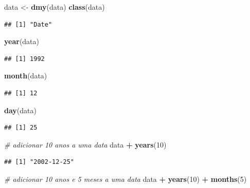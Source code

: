\documentclass[
]{book}
\newenvironment{Shaded}{\begin{snugshade}}{\end{snugshade}}
\newcommand{\CommentTok}[1]{\textcolor[rgb]{0.56,0.35,0.01}{\textit{#1}}}
\newcommand{\DecValTok}[1]{\textcolor[rgb]{0.00,0.00,0.81}{#1}}
\newcommand{\FunctionTok}[1]{\textcolor[rgb]{0.13,0.29,0.53}{\textbf{#1}}}
\newcommand{\NormalTok}[1]{#1}
\newcommand{\OtherTok}[1]{\textcolor[rgb]{0.56,0.35,0.01}{#1}}
\newcommand{\SpecialCharTok}[1]{\textcolor[rgb]{0.81,0.36,0.00}{\textbf{#1}}}
\begin{document}
\begin{Shaded}
\begin{Highlighting}[]
\NormalTok{data }\OtherTok{\textless{}{-}} \FunctionTok{dmy}\NormalTok{(data)}
\FunctionTok{class}\NormalTok{(data)}
\end{Highlighting}
\end{Shaded}

\begin{verbatim}
## [1] "Date"
\end{verbatim}

\begin{Shaded}
\begin{Highlighting}[]
\FunctionTok{year}\NormalTok{(data)}
\end{Highlighting}
\end{Shaded}

\begin{verbatim}
## [1] 1992
\end{verbatim}

\begin{Shaded}
\begin{Highlighting}[]
\FunctionTok{month}\NormalTok{(data)}
\end{Highlighting}
\end{Shaded}

\begin{verbatim}
## [1] 12
\end{verbatim}

\begin{Shaded}
\begin{Highlighting}[]
\FunctionTok{day}\NormalTok{(data)}
\end{Highlighting}
\end{Shaded}

\begin{verbatim}
## [1] 25
\end{verbatim}

\begin{Shaded}
\begin{Highlighting}[]
\CommentTok{\# adicionar 10 anos a uma data}
\NormalTok{data }\SpecialCharTok{+} \FunctionTok{years}\NormalTok{(}\DecValTok{10}\NormalTok{)}
\end{Highlighting}
\end{Shaded}

\begin{verbatim}
## [1] "2002-12-25"
\end{verbatim}

\begin{Shaded}
\begin{Highlighting}[]
\CommentTok{\# adicionar 10 anos e 5 meses a uma data}
\NormalTok{data }\SpecialCharTok{+} \FunctionTok{years}\NormalTok{(}\DecValTok{10}\NormalTok{) }\SpecialCharTok{+} \FunctionTok{months}\NormalTok{(}\DecValTok{5}\NormalTok{)}
\end{Highlighting}
\end{Shaded}
\end{document}
